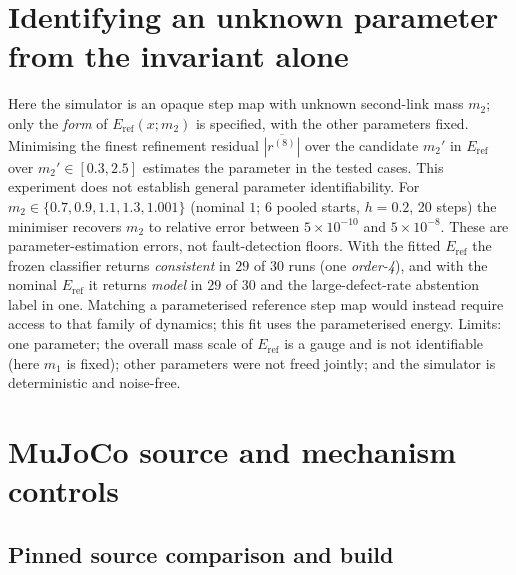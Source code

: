 \documentclass[10pt]{article}
\theoremstyle{definition}
\newcommand{\Eref}{E_{\mathrm{ref}}}
\begin{document}
\section{Identifying an unknown parameter from the invariant alone}\label{app:ident}

Here the simulator is an opaque step map with unknown second-link mass $m_2$;
only the \emph{form} of $\Eref(x;m_2)$ is specified, with the other parameters
fixed. Minimising the finest
refinement residual $\overline{|r^{(8)}|}$ over the candidate $m_2'$ in
$\Eref$ over $m_2'\in[0.3,2.5]$ estimates the parameter in the tested cases.
This experiment does not establish general parameter identifiability. For
$m_2\in\{0.7,0.9,1.1,1.3,1.001\}$ (nominal $1$; $6$ pooled starts, $h=0.2$, 20
steps) the minimiser recovers $m_2$ to relative error between
$5\times10^{-10}$ and $5\times10^{-8}$. These are parameter-estimation errors,
not fault-detection floors. With the fitted $\Eref$ the frozen classifier returns \emph{consistent}
in $29$ of $30$ runs (one \emph{order-4}), and with the nominal $\Eref$ it
returns \emph{model} in $29$ of $30$ and the large-defect-rate abstention
label in one. Matching a parameterised reference step map would instead require
access to that family of dynamics; this fit uses the parameterised energy.
Limits: one parameter; the
overall mass scale of $\Eref$ is a gauge and is not identifiable (here $m_1$
is fixed); other parameters were not freed jointly; and the simulator is
deterministic and noise-free.

\section{MuJoCo source and mechanism controls}\label{app:mj-controls}

\subsection{Pinned source comparison and build}\label{app:mj-source}
\end{document}
